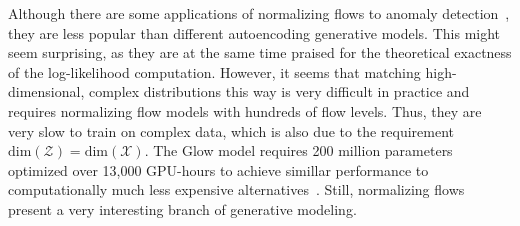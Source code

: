 Although there are some applications of normalizing flows to anomaly detection~\cite{kirichenkoWhyNormalizingFlows2020, dias2020anomaly, rudolph2021same, gudovskiy2022cflow}, they are less popular than different autoencoding generative models. This might seem surprising, as they are at the same time praised for the theoretical exactness of the log-likelihood computation. However, it seems that matching high-dimensional, complex distributions this way is very difficult in practice and requires normalizing flow models with hundreds of flow levels. Thus, they are very slow to train on complex data, which is also due to the requirement $\text{dim}(\mathcal{Z}) = \text{dim}(\mathcal{X})$. The Glow model requires 200 million parameters optimized over 13,000 GPU-hours to achieve simillar performance to computationally much less expensive alternatives~\cite{kingma2018glow}. Still, normalizing flows present a very interesting branch of generative modeling.



